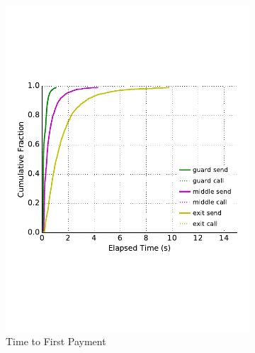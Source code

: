 \begin{figure}
\begin{subfigure}[t]{0.32\textwidth}
\includegraphics[trim={0 3cm 0 3cm}, clip, width=1.0\textwidth]{images/payment_pay.pdf}
		\caption{Time to First Payment}
\label{fig:ttfp}
	\end{subfigure}
	\begin{subfigure}[t]{0.32\textwidth} \centering

\end{subfigure}
\end{figure}
